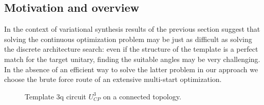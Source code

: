 \documentclass[draft, twocolumn, amsfonts, amssymb, aps, nofootinbib]{revtex4-2}
\begin{document}
\subsection{Motivation and overview}
In the context of variational synthesis results of the previous section suggest that solving the continuous optimization problem may be just as difficult as solving the discrete architecture search: even if the structure of the template is a perfect match for the target unitary, finding the suitable angles may be very challenging. In the absence of an efficient way to solve the latter problem in our approach we choose the brute force route of an extensive multi-start optimization.
\begin{figure*}
	\caption{ Template 3q circuit $U_{CP}^3$ on a connected topology.}
	\label{fig cp template}
\end{figure*}
\end{document}
